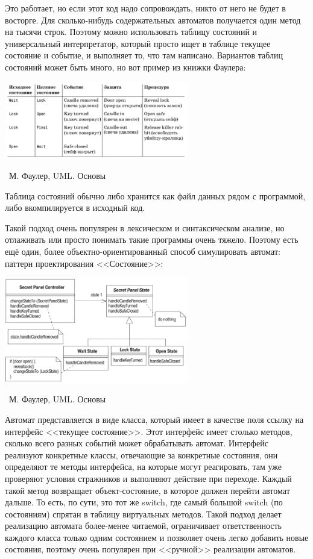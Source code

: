 \documentclass[a5paper]{article}
\newcommand{\attribution}[1] {
    \vspace{-5mm}\begin{flushright}\begin{scriptsize}%
    {\textcopyright\, #1}\end{scriptsize}\end{flushright}
}
\begin{document}
Это работает, но если этот код надо сопровождать, никто от него не будет в восторге. Для сколько-нибудь содержательных автоматов получается один метод на тысячи строк. Поэтому можно использовать таблицу состояний и универсальный интерпретатор, который просто ищет в таблице текущее состояние и событие, и выполняет то, что там написано. Вариантов таблиц состояний может быть много, но вот пример из книжки Фаулера:

\begin{center}
    \includegraphics[width=0.6\textwidth]{stateTransitionStateTable.png}
    \attribution{М. Фаулер, UML. Основы}
\end{center}

Таблица состояний обычно либо хранится как файл данных рядом с программой, либо вкомпилируется в исходный код. 

Такой подход очень популярен в лексическом и синтаксическом анализе, но отлаживать или просто понимать такие программы очень тяжело. Поэтому есть ещё один, более объектно-ориентированный способ симулировать автомат: паттерн проектирования <<Состояние>>:

\begin{center}
    \includegraphics[width=0.6\textwidth]{stateTransitionStatePattern.png}
    \attribution{М. Фаулер, UML. Основы}
\end{center}

Автомат представляется в виде класса, который имеет в качестве поля ссылку на интерфейс <<текущее состояние>>. Этот интерфейс имеет столько методов, сколько всего разных событий может обрабатывать автомат. Интерфейс реализуют конкретные классы, отвечающие за конкретные состояния, они определяют те методы интерфейса, на которые могут реагировать, там уже проверяют условия стражников и выполняют действие при переходе. Каждый такой метод возвращает объект-состояние, в которое должен перейти автомат дальше. То есть, по сути, это тот же switch, где самый большой switch (по состояниям) спрятан в таблицу виртуальных методов. Такой подход делает реализацию автомата более-менее читаемой, ограничивает ответственность каждого класса только одним состоянием и позволяет очень легко добавить новые состояния, поэтому очень популярен при <<ручной>> реализации автоматов.
\end{document}
